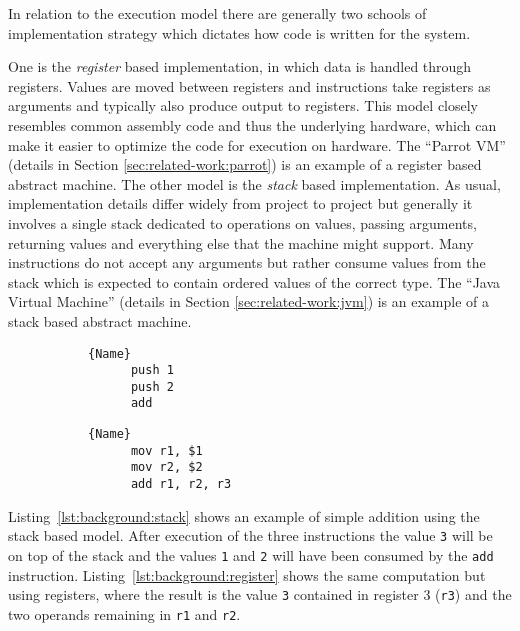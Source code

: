 In relation to the execution model there are generally two schools of
implementation strategy which dictates how code is written for the system.

One is the \textit{register} based implementation, in which data is handled
through registers. Values are moved between registers and instructions take
registers as arguments and typically also produce output to registers. This
model closely resembles common assembly code and thus the underlying hardware,
which can make it easier to optimize the code for execution on hardware. The
``Parrot VM'' (details in Section \ref{sec:related-work:parrot}) is an example
of a register based abstract machine. The other model is the \textit{stack}
based implementation. As usual, implementation details differ widely from
project to project but generally it involves a single stack dedicated to
operations on values, passing arguments, returning values and everything else
that the machine might support. Many instructions do not accept any arguments
but rather consume values from the stack which is expected to contain ordered
values of the correct type. The ``Java Virtual Machine'' (details in Section
\ref{sec:related-work:jvm}) is an example of a stack based abstract machine.

\begin{figure}[h]
  \centering
  \begin{subfigure}[t]{.45\textwidth}
    \begin{lstlisting}[label={lst:background:stack}, caption=Stack based addition, frame=tlrb, numbers=none]{Name}
      push 1
      push 2
      add
    \end{lstlisting}
  \end{subfigure}
  \begin{subfigure}[t]{.45\textwidth}
    \begin{lstlisting}[label={lst:background:register}, caption=Register based addition, frame=tlrb, numbers=none]{Name}
      mov r1, $1
      mov r2, $2
      add r1, r2, r3
    \end{lstlisting}
  \end{subfigure}
\end{figure}

Listing~\ref{lst:background:stack} shows an example of simple addition using the
stack based model. After execution of the three instructions the value
\texttt{3} will be on top of the stack and the values \texttt{1} and \texttt{2}
will have been consumed by the \texttt{add}
instruction. Listing~\ref{lst:background:register} shows the same computation
but using registers, where the result is the value \texttt{3} contained in
register 3 (\texttt{r3}) and the two operands remaining in \texttt{r1} and
\texttt{r2}.

